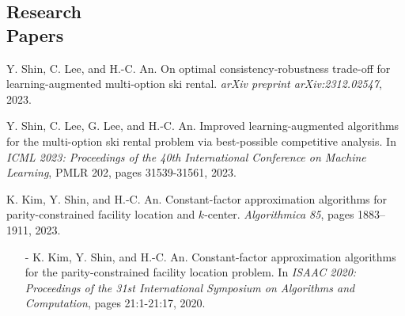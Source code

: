 \documentclass[margin, 10pt]{res} %
\begin{document}
\begin{resume}

\section{Research \\ Papers}
Y. Shin, C. Lee, and H.-C. An. On optimal consistency-robustness trade-off for learning-augmented multi-option ski rental. \emph{arXiv preprint arXiv:2312.02547}, 2023.

Y. Shin, C. Lee, G. Lee, and H.-C. An. Improved learning-augmented algorithms for the multi-option ski rental problem via best-possible competitive analysis. In \emph{ICML 2023: Proceedings of the 40th International Conference on Machine Learning}, PMLR 202, pages 31539-31561, 2023.

K. Kim, Y. Shin, and H.-C. An. Constant-factor approximation algorithms for parity-constrained facility location and $k$-center. \emph{Algorithmica 85}, pages 1883–1911, 2023.

\begin{itemize} %
\item[-] K. Kim, Y. Shin, and H.-C. An. Constant-factor approximation algorithms for the parity-constrained facility location problem. In \emph{ISAAC 2020: Proceedings of the 31st International Symposium on Algorithms and Computation}, pages 21:1-21:17, 2020.
\end{itemize}


\end{resume}
\end{document}
